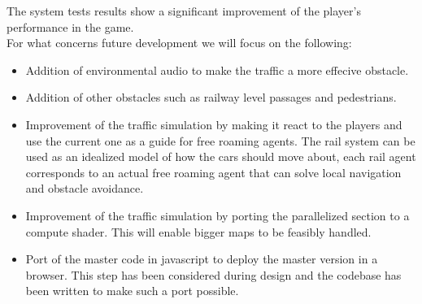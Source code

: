 \documentclass[12pt]{article}
\newcommand\blankpage{%
    \null
    \thispagestyle{empty}%
    \addtocounter{page}{-1}%
    \newpage}
\begin{document}
The system tests results show a significant improvement of the player's performance in the game. \\

For what concerns future development we will focus on the following:

\begin{itemize}
	\item Addition of environmental audio to make the traffic a more effecive obstacle.
	\item Addition of other obstacles such as railway level passages and pedestrians.
	\item Improvement of the traffic simulation by making it react to the players and use the current one as a guide for free roaming agents. The rail system can be used as an idealized model of how the cars should move about, each rail agent corresponds to an actual free roaming agent that can solve local navigation and obstacle avoidance.
	\item Improvement of the traffic simulation by porting the parallelized section to a compute shader. This will enable bigger maps to be feasibly handled.
	\item Port of the master code in javascript to deploy the master version in a browser. This step has been considered during design and the codebase has been written to make such a port possible.
\end{itemize}

\afterpage{\blankpage}

\clearpage
\end{document}
